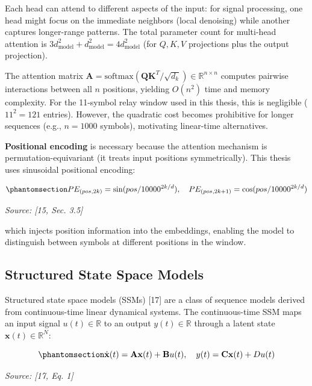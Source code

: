 Each head can attend to different aspects of the input: for signal processing, one head might focus on the immediate neighbors (local denoising) while another captures longer-range patterns. The total parameter count for multi-head attention is \(3 d_{\text{model}}^2 + d_{\text{model}}^2 = 4 d_{\text{model}}^2\) (for \(Q, K, V\) projections plus the output projection).

The attention matrix \(\mathbf{A} = \text{softmax}(\mathbf{Q}\mathbf{K}^T / \sqrt{d_k}) \in \mathbb{R}^{n \times n}\) computes pairwise interactions between all \(n\) positions, yielding \(O(n^2)\) time and memory complexity. For the 11-symbol relay window used in this thesis, this is negligible (\(11^2 = 121\) entries). However, the quadratic cost becomes prohibitive for longer sequences (e.g., \(n = 1000\) symbols), motivating linear-time alternatives.

\textbf{Positional encoding} is necessary because the attention mechanism is permutation-equivariant (it treats input positions symmetrically). This thesis uses sinusoidal positional encoding:

\begin{equation}\protect\phantomsection\label{eq:positional-encoding}{PE_{(pos, 2k)} = \sin(pos / 10000^{2k/d}), \quad PE_{(pos, 2k+1)} = \cos(pos / 10000^{2k/d})
}\end{equation} \par{\small\textit{Source: [15, Sec. 3.5]}}

which injects position information into the embeddings, enabling the model to distinguish between symbols at different positions in the window.

\subsection{Structured State Space Models}\label{sec:structured-state-space-models}

Structured state space models (SSMs) {[}17{]} are a class of sequence models derived from continuous-time linear dynamical systems. The continuous-time SSM maps an input signal \(u(t) \in \mathbb{R}\) to an output \(y(t) \in \mathbb{R}\) through a latent state \(\mathbf{x}(t) \in \mathbb{R}^N\):

\begin{equation}\protect\phantomsection\label{eq:ssm-continuous}{\dot{\mathbf{x}}(t) = \mathbf{A}\mathbf{x}(t) + \mathbf{B}u(t), \quad y(t) = \mathbf{C}\mathbf{x}(t) + Du(t)
}\end{equation} \par{\small\textit{Source: [17, Eq. 1]}}

